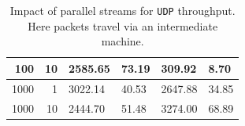 \documentclass[12pt,a4paper,twoside,openright]{report}
\begin{document}
\begin{table}[H]
\begin{tabular}{|r|r|l|l|l|l|}
100                                                                                              & 10                                                                                                                         & 2585.65                                                                                                                                         & 73.19                                                                                                                            & 309.92                                                                                                   & 8.70                                                                                                                             \\ \hline
1000                                                                                             & 1                                                                                                                          & 3022.14                                                                                                                                         & 40.53                                                                                                                            & 2647.88                                                                                                  & 34.85                                                                                                                            \\ \hline
1000                                                                                             & 10                                                                                                                         & 2444.70                                                                                                                                         & 51.48                                                                                                                            & 3274.00                                                                                                  & 68.89                                                                                                                            \\ \hline
\end{tabular}
    \centering
    \caption[Impact of parallel streams for \texttt{UDP} throughput]{Impact of parallel streams for \texttt{UDP} throughput. Here packets travel via an intermediate machine.}
    \label{fig:UDP_throughput_via_B_using_parallel_streams}
\end{table}
\end{document}
